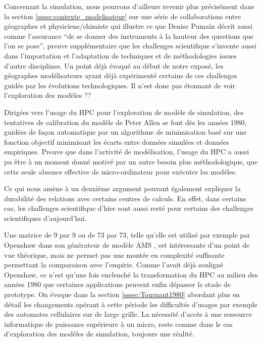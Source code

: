 
Concernant la simulation, nous pourrons d'ailleurs revenir plus précisément dans la section \ref{sssec:contexte_modelisateur} sur une série de collaborations entre géographes et physiciens/chimiste qui illustre ce que Denise Pumain décrit aussi comme l'assurance \enquote{de se donner des instruments à la hauteur des questions que l'on se pose}, preuve supplémentaire que les challenges scientifique s'invente aussi dans l'importation et l'adaptation de techniques et de méthodologies issues d'autre disciplines. Un point déjà évoqué au début de notre exposé, les géographes modélisateurs ayant déjà expérimenté certains de ces challenges guidés par les évolutions technologiques. Il n'est donc pas étonnant de voir l'exploration des modèles ??

Dirigées vers l'usage du HPC pour l'exploration de modèle de simulation, des tentatives de calibration du modèle de Peter Allen se font dès les années 1980, guidées de façon automatique par un algorithme de minimisation basé sur une fonction objectif minimisant les écarts entre données simulées et données empiriques. Preuve que dans l'activité de modélisation, l'usage du HPC a aussi pu être à un moment donné motivé par un autre besoin plus méthodologique, que cette seule absence effective de micro-ordinateur pour exécuter les modèles.

Ce qui nous amène à un deuxième argument pouvant également expliquer la durabilité des relations avec certains centres de calculs. En effet, dans certains cas, les challenges scientifique d'hier sont aussi resté pour certains des challenges scientifiques d'aujourd'hui.

Une matrice de 9 par 9 ou de 73 par 73, telle qu'elle est utilisé par exemple par Openshaw dans son générateur de modèle AMS \autocite[40]{Openshaw1988}, est intéressante d'un point de vue théorique, mais ne permet pas une montée en complexité suffisante permettant la comparaison avec l'empirie. Comme l'avait déjà souligné Openshaw, ce n'est qu'une fois enclenché la transformation du HPC au milieu des années 1980 que certaines applications peuvent enfin dépasser le stade de prototype. On évoque dans la section \ref{sssec:Tournant1980} abordant plus en détail les changements opérant à cette période les difficultés d'usages par exemple des automates cellulaires sur de large grille. La nécessité d'accès à une ressource informatique de puissance supérieure à un micro, reste comme dans le cas d'exploration des modèles de simulation, toujours une réalité.

